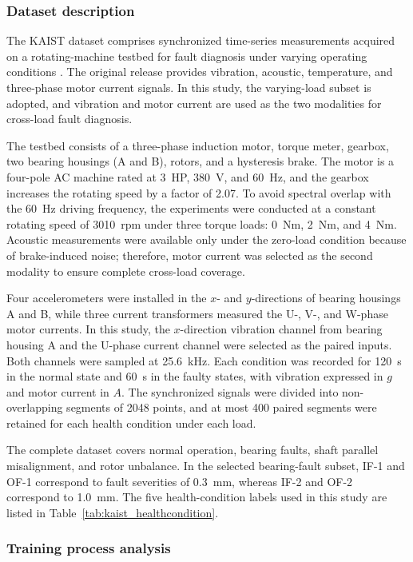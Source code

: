 \documentclass[a4paper]{cas-sc}
\begin{document}
\subsubsection{Dataset description}

The KAIST dataset comprises synchronized time-series measurements acquired on a rotating-machine testbed for fault diagnosis under varying operating conditions \cite{KAIST}. The original release provides vibration, acoustic, temperature, and three-phase motor current signals. In this study, the varying-load subset is adopted, and vibration and motor current are used as the two modalities for cross-load fault diagnosis.

The testbed consists of a three-phase induction motor, torque meter, gearbox, two bearing housings (A and B), rotors, and a hysteresis brake. The motor is a four-pole AC machine rated at 3~HP, 380~V, and 60~Hz, and the gearbox increases the rotating speed by a factor of 2.07. To avoid spectral overlap with the 60~Hz driving frequency, the experiments were conducted at a constant rotating speed of 3010~rpm under three torque loads:
0~Nm, 2~Nm, and 4~Nm. Acoustic measurements were available only under the zero-load condition because of brake-induced noise; therefore, motor current was selected as the second modality to ensure complete cross-load coverage.

Four accelerometers were installed in the $x$- and $y$-directions of bearing housings A and B, while three current transformers measured the U-, V-, and W-phase motor currents. In this study, the $x$-direction vibration channel from bearing housing A and the
U-phase current channel were selected as the paired inputs. Both channels were sampled at 25.6~kHz. Each condition was recorded for 120~s in the normal state and 60~s in the faulty states, with vibration expressed in $g$ and motor current in $A$. The synchronized signals were divided into non-overlapping segments of 2048 points, and at most 400 paired segments were retained for each health condition under each load.

The complete dataset covers normal operation, bearing faults, shaft parallel misalignment, and rotor unbalance. In the selected bearing-fault subset, IF-1 and OF-1 correspond to fault severities of 0.3~mm, whereas IF-2 and OF-2 correspond to 1.0~mm. The five
health-condition labels used in this study are listed in
Table~\ref{tab:kaist_healthcondition}.

\subsubsection{Training process analysis}
\label{sec:case2_training_process}
\end{document}
